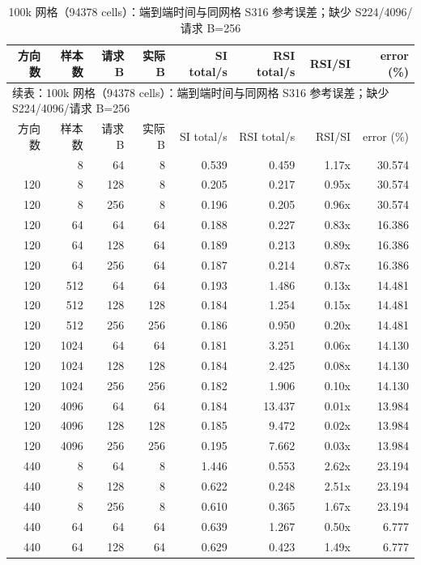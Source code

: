 {\tiny\setlength{\tabcolsep}{2.3pt}
\begin{longtable}{rrrrrrrr}
\caption{100k 网格（94378 cells）：端到端时间与同网格 S316 参考误差；缺少 S224/4096/请求 B=256}\label{tab:factor-time-100k}\\
\toprule
方向数 & 样本数 & 请求 B & 实际 B & SI total/s & RSI total/s & RSI/SI & error (\%)\\
\midrule
\endfirsthead
\multicolumn{8}{l}{\small 续表：100k 网格（94378 cells）：端到端时间与同网格 S316 参考误差；缺少 S224/4096/请求 B=256}\\
\toprule
方向数 & 样本数 & 请求 B & 实际 B & SI total/s & RSI total/s & RSI/SI & error (\%)\\
\midrule
\endhead
\bottomrule
\endfoot
120 & 8 & 64 & 8 & 0.539 & 0.459 & 1.17x & 30.574\\
120 & 8 & 128 & 8 & 0.205 & 0.217 & 0.95x & 30.574\\
120 & 8 & 256 & 8 & 0.196 & 0.205 & 0.96x & 30.574\\
120 & 64 & 64 & 64 & 0.188 & 0.227 & 0.83x & 16.386\\
120 & 64 & 128 & 64 & 0.189 & 0.213 & 0.89x & 16.386\\
120 & 64 & 256 & 64 & 0.187 & 0.214 & 0.87x & 16.386\\
120 & 512 & 64 & 64 & 0.193 & 1.486 & 0.13x & 14.481\\
120 & 512 & 128 & 128 & 0.184 & 1.254 & 0.15x & 14.481\\
120 & 512 & 256 & 256 & 0.186 & 0.950 & 0.20x & 14.481\\
120 & 1024 & 64 & 64 & 0.181 & 3.251 & 0.06x & 14.130\\
120 & 1024 & 128 & 128 & 0.184 & 2.425 & 0.08x & 14.130\\
120 & 1024 & 256 & 256 & 0.182 & 1.906 & 0.10x & 14.130\\
120 & 4096 & 64 & 64 & 0.184 & 13.437 & 0.01x & 13.984\\
120 & 4096 & 128 & 128 & 0.185 & 9.472 & 0.02x & 13.984\\
120 & 4096 & 256 & 256 & 0.195 & 7.662 & 0.03x & 13.984\\
440 & 8 & 64 & 8 & 1.446 & 0.553 & 2.62x & 23.194\\
440 & 8 & 128 & 8 & 0.622 & 0.248 & 2.51x & 23.194\\
440 & 8 & 256 & 8 & 0.610 & 0.365 & 1.67x & 23.194\\
440 & 64 & 64 & 64 & 0.639 & 1.267 & 0.50x & 6.777\\
440 & 64 & 128 & 64 & 0.629 & 0.423 & 1.49x & 6.777\\

\end{longtable}}
